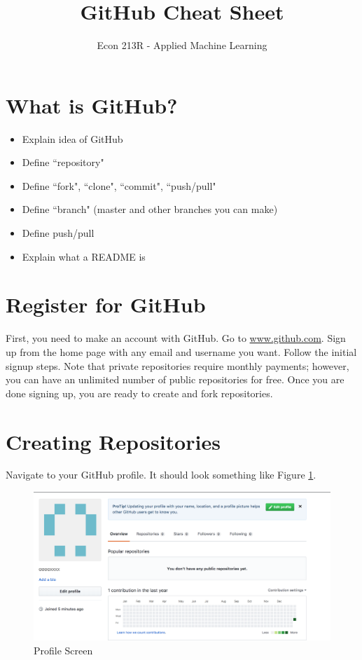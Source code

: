 \documentclass[11pt,a4paper]{article}
\title{GitHub Cheat Sheet}
\date{}
\author{Econ 213R - Applied Machine Learning}
\begin{document}
\vspace*{-75pt}
    {\let\newpage\relax\maketitle}
    
\section*{What is GitHub?}
\begin{itemize}
\item Explain idea of GitHub
\item Define ``repository"
\item Define ``fork", ``clone", ``commit", ``push/pull"
\item Define ``branch" (master and other branches you can make)
\item Define push/pull
\item Explain what a README is
\end{itemize}
    
\section*{Register for GitHub}
First, you need to make an account with GitHub.
Go to \url{www.github.com}. 
Sign up from the home page with any email and username you want.
Follow the initial signup steps.
Note that private repositories require monthly payments; however, you can have an unlimited number of public repositories for free.
Once you are done signing up, you are ready to create and fork repositories.

\section*{Creating Repositories}
Navigate to your GitHub profile.
It should look something like Figure \ref{fig:init-prof}.

\begin{figure}[h]
\centering
\includegraphics[width=.7\textwidth]{figures/init_profile.png}
\caption{Profile Screen}
\label{fig:init-prof}
\end{figure}
\end{document}
